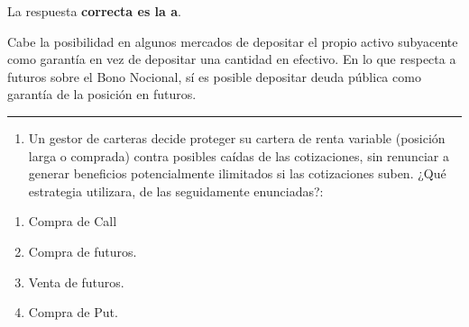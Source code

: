 \documentclass[
  letterpaper,
  DIV=11,
  numbers=noendperiod]{scrreprt}
\providecommand{\tightlist}{%
  \setlength{\itemsep}{0pt}\setlength{\parskip}{0pt}}\usepackage{longtable,booktabs,array}
\begin{document}
\begin{tcolorbox}[enhanced jigsaw, left=2mm, opacityback=0, colback=white, breakable, arc=.35mm, bottomrule=.15mm, rightrule=.15mm, toprule=.15mm, leftrule=.75mm, colframe=quarto-callout-tip-color-frame]
\begin{minipage}[t]{5.5mm}
\textcolor{quarto-callout-tip-color}{\faLightbulb}
\end{minipage}%
\begin{minipage}[t]{\textwidth - 5.5mm}

La respuesta \textbf{correcta es la a}.

Cabe la posibilidad en algunos mercados de depositar el propio activo
subyacente como garantía en vez de depositar una cantidad en efectivo.
En lo que respecta a futuros sobre el Bono Nocional, sí es posible
depositar deuda pública como garantía de la posición en futuros.

\end{minipage}%
\end{tcolorbox}

\begin{center}\rule{0.5\linewidth}{0.5pt}\end{center}

\begin{enumerate}
\def\labelenumi{\arabic{enumi}.}
\setcounter{enumi}{3}
\tightlist
\item
  Un gestor de carteras decide proteger su cartera de renta variable
  (posición larga o comprada) contra posibles caídas de las
  cotizaciones, sin renunciar a generar beneficios potencialmente
  ilimitados si las cotizaciones suben. ¿Qué estrategia utilizara, de
  las seguidamente enunciadas?:
\end{enumerate}

\begin{enumerate}
\def\labelenumi{\alph{enumi})}
\item
  Compra de Call
\item
  Compra de futuros.
\item
  Venta de futuros.
\item
  Compra de Put.
\end{enumerate}
\end{document}
